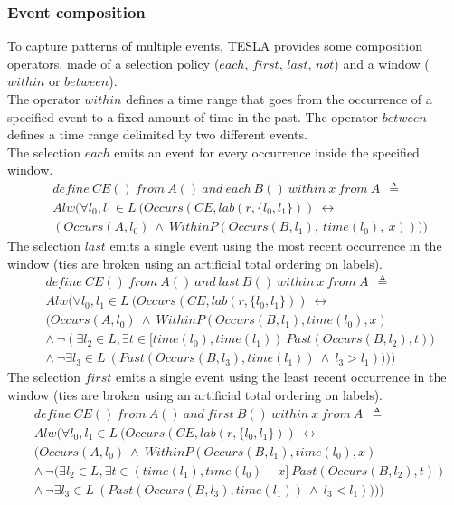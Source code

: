 \subsubsection{Event composition}
To capture patterns of multiple events, TESLA provides some composition operators, made of a selection policy ($each$, $first$, $last$, $not$) and a window ($within$ or $between$).\\
The operator $within$ defines a time range that goes from the occurrence of a specified event to a fixed amount of time in the past. The operator $between$ defines a time range delimited by two different events.\\
The selection $each$ emits an event for every occurrence inside the specified window.
\begin{align*}
&define\ CE()\ from\ A()\ and\ each\ B()\ within\ x\ from\ A\ \ \triangleq\\
&Alw(\forall l_0, l_1 \in L\ (Occurs(CE, lab(r, \{l_0, l_1\}))\ \leftrightarrow\\
&(Occurs(A, l_0)\ \wedge\ WithinP(Occurs(B, l_1),\ time(l_0),\ x))))
\end{align*}
The selection $last$ emits a single event using the most recent occurrence in the window (ties are broken using an artificial total ordering on labels).
\begin{align*}
&define\ CE()\ from\ A()\ and\ last\ B()\ within\ x\ from\ A\ \ \triangleq\\
&Alw(\forall l_0, l_1 \in L\ (Occurs(CE, lab(r, \{l_0, l_1\}))\ \leftrightarrow\\
&(Occurs(A, l_0)\ \wedge\ WithinP(Occurs(B, l_1),time(l_0),x)\\
&\wedge\ \neg (\exists l_2 \in L, \exists t\in [time(l_0), time(l_1))\ Past(Occurs(B, l_2),t))\\
&\wedge\ \neg \exists l_3 \in L\ (Past(Occurs(B, l_3), time(l_1))\ \wedge\ l_3 > l_1)))) 
\end{align*}
The selection $first$ emits a single event using the least recent occurrence in the window (ties are broken using an artificial total ordering on labels).
\begin{align*}
&define\ CE()\ from\ A()\ and\ first\ B()\ within\ x\ from\ A\ \ \triangleq\\
&Alw(\forall l_0, l_1 \in L\ (Occurs(CE, lab(r, \{l_0, l_1\}))\ \leftrightarrow\\
&(Occurs(A, l_0)\ \wedge\ WithinP(Occurs(B, l_1),time(l_0),x)\\
&\wedge\ \neg (\exists l_2 \in L, \exists t\in (time(l_1), time(l_0) + x]\ Past(Occurs(B, l_2),t))\\
&\wedge\ \neg \exists l_3 \in L\ (Past(Occurs(B, l_3), time(l_1))\ \wedge\ l_3 < l_1))))
\end{align*}
